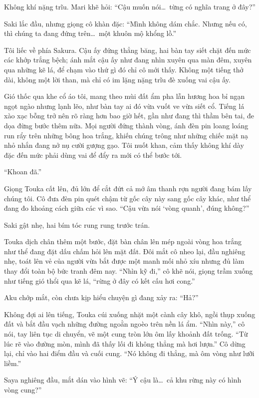 \documentclass[../main.tex]{subfiles}
\begin{document}
Không khí nặng trĩu. Mari khẽ hỏi: ``Cậu muốn nói\dots\ từng có nghĩa trang ở đây?''

Saki lắc đầu, nhưng giọng cô khàn đặc: ``Mình không dám chắc. Nhưng nếu có, thì chúng ta đang đứng trên\dots\ một khuôn mộ khổng lồ.''

Tôi liếc về phía Sakura. Cậu ấy đứng thẳng băng, hai bàn tay siết chặt đến mức các khớp trắng bệch; ánh mắt cậu ấy như đang nhìn xuyên qua màn đêm, xuyên qua những kẽ lá, để chạm vào thứ gì đó chỉ cô mới thấy. Không một tiếng thở dài, không một lời than, mà chỉ có im lặng nặng trĩu đè xuống vai cậu ấy.

Gió thốc qua khe cổ áo tôi, mang theo mùi đất ẩm pha lẫn hương hoa bỉ ngạn ngọt ngào nhưng lạnh lẽo, như bàn tay ai đó vừa vuốt ve vừa siết cổ. Tiếng lá xào xạc bỗng trở nên rõ ràng hơn bao giờ hết, gần như đang thì thầm bên tai, đe dọa đừng bước thêm nữa. Mọi người đứng thành vòng, ánh đèn pin loang loáng run rẩy trên những bông hoa trắng, khiến chúng trông như những chiếc mặt nạ nhỏ nhắn đang nở nụ cười gượng gạo. Tôi nuốt khan, cảm thấy không khí dày đặc đến mức phải dùng vai để đẩy ra mới có thể bước tới.

``Khoan đã.''

Giọng Touka cất lên, đủ lớn để cắt đứt cả mớ âm thanh rợn người đang bám lấy chúng tôi. Cô đưa đèn pin quét chậm từ gốc cây này sang gốc cây khác, như thể đang đo khoảng cách giữa các vì sao. ``Cậu vừa nói `vòng quanh', đúng không?''

Saki gật nhẹ, hai bím tóc rung rung trước trán.

Touka dịch chân thêm một bước, đặt bàn chân lên mép ngoài vòng hoa trắng như thể đang đặt dấu chấm hỏi lên mặt đất. Đôi mắt cô nheo lại, đầu nghiêng nhẹ, toát lên vẻ của người vừa bắt được một manh mối nhỏ xíu nhưng đủ làm thay đổi toàn bộ bức tranh đêm nay. ``Nhìn kỹ đi,'' cô khẽ nói, giọng trầm xuống như tiếng gió thổi qua kẽ lá, ``rừng ở đây có kết cấu hơi cong.''

Aku chớp mắt, còn chưa kịp hiểu chuyện gì đang xảy ra: ``Hả?''

Không đợi ai lên tiếng, Touka cúi xuống nhặt một cành cây khô, ngồi thụp xuống đất và bắt đầu vạch những đường ngoằn ngoèo trên nền lá ẩm. ``Nhìn này,'' cô nói, tay liên tục di chuyển, vẽ một cung tròn lớn ôm lấy khoảnh đất trống. ``Từ lúc rẽ vào đường mòn, mình đã thấy lối đi không thẳng mà hơi lượn.'' Cô dừng lại, chỉ vào hai điểm đầu và cuối cung. ``Nó không đi thẳng, mà ôm vòng như lưỡi liềm.''

Saya nghiêng đầu, mắt dán vào hình vẽ: ``Ý cậu là\dots\ cả khu rừng này có hình vòng cung?''
\end{document}
